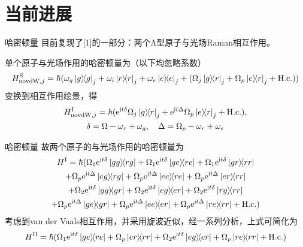 \documentclass[10pt,aspectratio=43]{beamer}
\begin{document}
\section{当前进展}
\begin{frame}{哈密顿量}
目前复现了[1]的一部分：两个Λ型原子与光场Raman相互作用。

单个原子与光场作用的哈密顿量为（以下均忽略系数）
\begin{equation}
H_{\mathrm{novdW},j}^\mathrm{S}=\hbar(\omega_g\ketbra{g}{g}_j+\omega_i\ketbra{r}{r}_j+\omega_e\ketbra{e}{e}_j+(\Omega_j\ketbra{g}{r}_j+\Omega_p\ketbra{e}{r}_j+\mathrm{H.c.}))
\end{equation}
变换到相互作用绘景，得
\begin{equation}\label{}
\begin{gathered}
H_{\mathrm{novdW},j}^\mathrm{I}=\hbar(\mathrm{e}^{\mathrm{i}t\delta}\Omega_j\ketbra{g}{r}_j+\mathrm{e}^{\mathrm{i}t\Delta}\Omega_p\ketbra{e}{r}_j+\mathrm{H.c.}),\\
\delta=\Omega-\omega_r+\omega_g,\quad\Delta=\Omega_p-\omega_r+\omega_e
\end{gathered}
\end{equation}
\end{frame}
\begin{frame}{哈密顿量}
故两个原子的与光场作用的哈密顿量为
\begin{multline}
H^\mathrm{I}
=\hbar(\Omega_1\mathrm{e}^{\mathrm{i}t\delta}\ketbra{gg}{rg}
+\Omega_1\mathrm{e}^{\mathrm{i}t\delta}\ketbra{ge}{re}
+\Omega_1\mathrm{e}^{\mathrm{i}t\delta}\ketbra{gr}{rr}\\
+\Omega_p\mathrm{e}^{\mathrm{i}t\Delta}\ketbra{eg}{rg}
+\Omega_p\mathrm{e}^{\mathrm{i}t\Delta}\ketbra{ee}{re}
+\Omega_p\mathrm{e}^{\mathrm{i}t\Delta}\ketbra{er}{rr}\\
+\Omega_2\mathrm{e}^{\mathrm{i}t\delta}\ketbra{gg}{gr}
+\Omega_2\mathrm{e}^{\mathrm{i}t\delta}\ketbra{eg}{er}
+\Omega_2\mathrm{e}^{\mathrm{i}t\delta}\ketbra{rg}{rr}\\
+\Omega_p\mathrm{e}^{\mathrm{i}t\Delta}\ketbra{ge}{gr}
+\Omega_p\mathrm{e}^{\mathrm{i}t\Delta}\ketbra{ee}{er}
+\Omega_p\mathrm{e}^{\mathrm{i}t\Delta}\ketbra{re}{rr}
+\mathrm{H.c.})
\end{multline}
考虑到van der Vaals相互作用，并采用旋波近似，经一系列分析，上式可简化为
\begin{equation}\label{key}
H^{\mathrm{II}}=\hbar(\Omega_1\mathrm{e}^{\mathrm{i}t \delta}\ketbra{ge}{re}
+\Omega_p\ketbra{er}{rr}
+\Omega_2\mathrm{e}^{\mathrm{i}t \delta}\ketbra{eg}{er}
+\Omega_p\ketbra{re}{rr}+\mathrm{H.c.})
\end{equation}

\end{frame}
\end{document}
